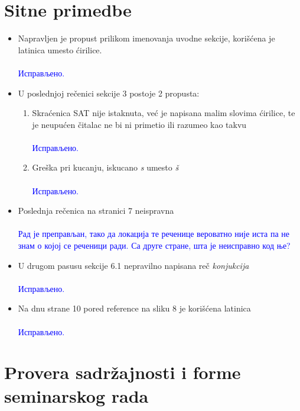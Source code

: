 \documentclass[a4paper]{report}
\newcommand{\odgovor}[1]{\textcolor{blue}{#1}}
\newcommand{\say}[1]{\textit{#1}}
\begin{document}
\section{Sitne primedbe}
\begin{itemize}
 \item Napravljen je propust prilikom imenovanja uvodne sekcije, korišćena je latinica umesto ćirilice.
     \\\\
    \odgovor{Исправљено.} 
	\\
 \item U poslednjoj rečenici sekcije 3 postoje 2 propusta:
 	\begin{enumerate}
 		\item Skraćenica SAT nije istaknuta, već je napisana malim slovima ćirilice, te je neupućen čitalac ne bi ni primetio ili razumeo kao takvu
     \\\\
    \odgovor{Исправљено.} 
	\\
 		\item Greška pri kucanju, iskucano \say{s} umesto \say{š}
     \\\\
    \odgovor{Исправљено.} 
	\\
 	\end{enumerate}
 \item Poslednja rečenica na stranici 7 neispravna
 \\\\
    \odgovor{Рад је преправљан, тако да локација те реченице вероватно није иста па не знам о којој се реченици ради. Са друге стране, шта је неисправно код ње?} 
	\\
 \item U drugom pasusu sekcije 6.1 nepravilno napisana reč \say{konjukcija}
    \\\\
    \odgovor{Исправљено.} 
	\\
 \item Na dnu strane 10 pored reference na sliku 8 je korišćena latinica
      \\\\
    \odgovor{Исправљено.} 
	\\
\end{itemize}

\section{Provera sadržajnosti i forme seminarskog rada}
\end{document}
